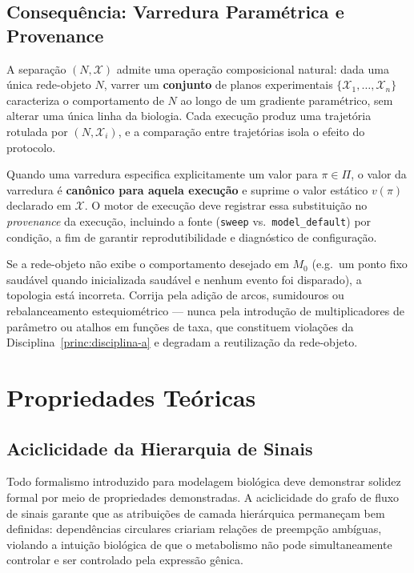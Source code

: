 \subsection{Consequência: Varredura Paramétrica e Provenance}
\label{subsec:varredura-provenance}

A separação $(N, \mathcal{X})$ admite uma operação composicional natural: dada
uma única rede-objeto $N$, varrer um \textbf{conjunto} de planos experimentais
$\{\mathcal{X}_1, \ldots, \mathcal{X}_n\}$ caracteriza o comportamento de $N$
ao longo de um gradiente paramétrico, sem alterar uma única linha da
biologia. Cada execução produz uma trajetória rotulada por $(N,
\mathcal{X}_i)$, e a comparação entre trajetórias isola o efeito do
protocolo.

Quando uma varredura especifica explicitamente um valor para $\pi \in \Pi$, o
valor da varredura é \textbf{canônico para aquela execução} e suprime o valor
estático $v(\pi)$ declarado em $\mathcal{X}$. O motor de execução deve
registrar essa substituição no \emph{provenance} da execução, incluindo a
fonte (\texttt{sweep} vs.\ \texttt{model\_default}) por condição, a fim de
garantir reprodutibilidade e diagnóstico de configuração.

\begin{remark}
\label{rem:diagnostico-violacao}
Se a rede-objeto não exibe o comportamento desejado em $M_0$ (e.g.\ um
ponto fixo saudável quando inicializada saudável e nenhum evento foi
disparado), a topologia está incorreta. Corrija pela adição de arcos,
sumidouros ou rebalanceamento estequiométrico --- nunca pela introdução de
multiplicadores de parâmetro ou atalhos em funções de taxa, que constituem
violações da Disciplina~\ref{princ:disciplina-a} e degradam a reutilização
da rede-objeto.
\end{remark}

\section{Propriedades Teóricas}
\label{sec:propriedades-teoricas}

\subsection{Aciclicidade da Hierarquia de Sinais}
\label{subsec:aciclicidade}

Todo formalismo introduzido para modelagem biológica deve demonstrar
solidez formal por meio de propriedades demonstradas. A aciclicidade do grafo de
fluxo de sinais garante que as atribuições de camada hierárquica permaneçam bem
definidas: dependências circulares criariam relações de preempção ambíguas,
violando a intuição biológica de que o metabolismo não pode simultaneamente
controlar e ser controlado pela expressão gênica.

